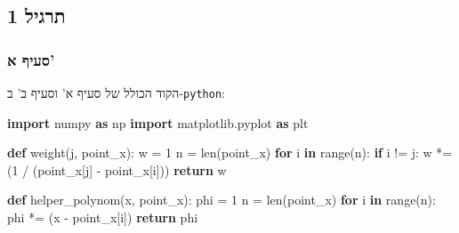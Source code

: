 \documentclass[
]{article}
\newenvironment{Shaded}{}{}
\newcommand{\BuiltInTok}[1]{\textcolor[rgb]{0.00,0.50,0.00}{#1}}
\newcommand{\ControlFlowTok}[1]{\textcolor[rgb]{0.00,0.44,0.13}{\textbf{#1}}}
\newcommand{\DecValTok}[1]{\textcolor[rgb]{0.25,0.63,0.44}{#1}}
\newcommand{\ImportTok}[1]{\textcolor[rgb]{0.00,0.50,0.00}{\textbf{#1}}}
\newcommand{\KeywordTok}[1]{\textcolor[rgb]{0.00,0.44,0.13}{\textbf{#1}}}
\newcommand{\NormalTok}[1]{#1}
\newcommand{\OperatorTok}[1]{\textcolor[rgb]{0.40,0.40,0.40}{#1}}
\begin{document}
\subsection{תרגיל 1}\label{ux5eaux5e8ux5d2ux5d9ux5dc-1}

\subsubsection{סעיף א'}\label{ux5e1ux5e2ux5d9ux5e3-ux5d0}

הקוד הכולל של סעיף א' וסעיף ב' ב-\texttt{python}:

\begin{Shaded}
\begin{Highlighting}[]
\ImportTok{import}\NormalTok{ numpy }\ImportTok{as}\NormalTok{ np}
\ImportTok{import}\NormalTok{ matplotlib.pyplot }\ImportTok{as}\NormalTok{ plt}

\KeywordTok{def}\NormalTok{ weight(j, point\_x):}
\NormalTok{    w }\OperatorTok{=} \DecValTok{1}
\NormalTok{    n }\OperatorTok{=} \BuiltInTok{len}\NormalTok{(point\_x)}
    \ControlFlowTok{for}\NormalTok{ i }\KeywordTok{in} \BuiltInTok{range}\NormalTok{(n):}
        \ControlFlowTok{if}\NormalTok{ i }\OperatorTok{!=}\NormalTok{ j:}
\NormalTok{            w }\OperatorTok{*=}\NormalTok{ (}\DecValTok{1} \OperatorTok{/}\NormalTok{ (point\_x[j] }\OperatorTok{{-}}\NormalTok{ point\_x[i]))}
    \ControlFlowTok{return}\NormalTok{ w}

\KeywordTok{def}\NormalTok{ helper\_polynom(x, point\_x):}
\NormalTok{    phi }\OperatorTok{=} \DecValTok{1}
\NormalTok{    n }\OperatorTok{=} \BuiltInTok{len}\NormalTok{(point\_x)}
    \ControlFlowTok{for}\NormalTok{ i }\KeywordTok{in} \BuiltInTok{range}\NormalTok{(n):}
\NormalTok{        phi }\OperatorTok{*=}\NormalTok{ (x }\OperatorTok{{-}}\NormalTok{ point\_x[i])}
    \ControlFlowTok{return}\NormalTok{ phi}
\end{Highlighting}
\end{Shaded}
\end{document}
